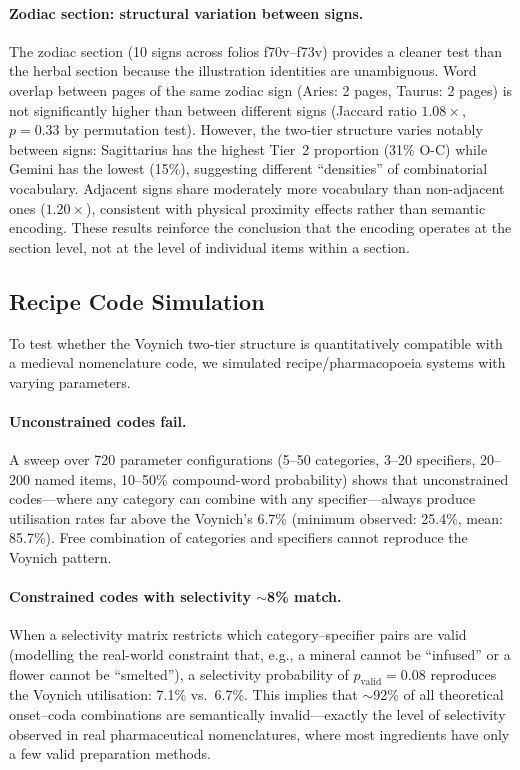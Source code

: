 \paragraph{Zodiac section: structural variation between signs.}
The zodiac section (10 signs across folios f70v--f73v) provides a cleaner test than the herbal section because the illustration identities are unambiguous.  Word overlap between pages of the same zodiac sign (Aries: 2 pages, Taurus: 2 pages) is not significantly higher than between different signs (Jaccard ratio $1.08\times$, $p = 0.33$ by permutation test).  However, the two-tier structure varies notably between signs: Sagittarius has the highest Tier~2 proportion (31\% O-C) while Gemini has the lowest (15\%), suggesting different ``densities'' of combinatorial vocabulary.  Adjacent signs share moderately more vocabulary than non-adjacent ones ($1.20\times$), consistent with physical proximity effects rather than semantic encoding.  These results reinforce the conclusion that the encoding operates at the section level, not at the level of individual items within a section.

\subsection{Recipe Code Simulation}

To test whether the Voynich two-tier structure is quantitatively compatible with a medieval nomenclature code, we simulated recipe/pharmacopoeia systems with varying parameters.

\paragraph{Unconstrained codes fail.}
A sweep over 720 parameter configurations (5--50 categories, 3--20 specifiers, 20--200 named items, 10--50\% compound-word probability) shows that unconstrained codes---where any category can combine with any specifier---always produce utilisation rates far above the Voynich's 6.7\% (minimum observed: 25.4\%, mean: 85.7\%).  Free combination of categories and specifiers cannot reproduce the Voynich pattern.

\paragraph{Constrained codes with selectivity $\sim$8\% match.}
When a selectivity matrix restricts which category--specifier pairs are valid (modelling the real-world constraint that, e.g., a mineral cannot be ``infused'' or a flower cannot be ``smelted''), a selectivity probability of $p_{\text{valid}} = 0.08$ reproduces the Voynich utilisation: 7.1\% vs.\ 6.7\%.  This implies that $\sim$92\% of all theoretical onset--coda combinations are semantically invalid---exactly the level of selectivity observed in real pharmaceutical nomenclatures, where most ingredients have only a few valid preparation methods.

